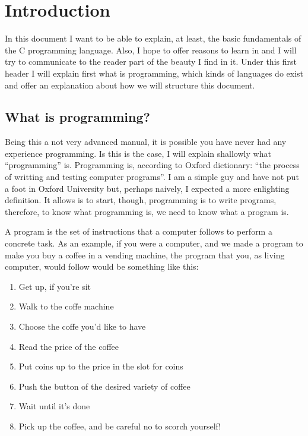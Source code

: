 \documentclass[a4paper]{article}
\begin{document}
\section{Introduction}
In this document I want to be able to explain, at least, the basic fundamentals
of the C programming language. Also, I hope to offer reasons to learn in and
I will try to communicate to the reader part of the beauty I find in it.
Under this first header I will explain first what is programming, which kinds
of languages do exist and offer an explanation about how we will structure this
document.

\label{section:queEsLaProgramacion}
\subsection{What is programming?}
Being this a not very advanced manual, it is possible you have never had any
experience programming. Is this is the case, I will explain shallowly what
``programming'' is. Programming is, according to Oxford dictionary: ``the
process of writting and testing computer programs''. I am a simple guy and
have not put a foot in Oxford University but, perhaps naively, I expected a more
enlighting definition. It allows is to start, though, programming is to write
programs, therefore, to know what programming is, we need to know what a program
is.

A program is the set of instructions that a computer follows to perform a
concrete task. As an example, if you were a computer, and we made a program to
make you buy a coffee in a vending machine, the program that you, as living
computer, would follow would be something like this:

\begin{enumerate}
    \item Get up, if you're sit
    \item Walk to the coffe machine
    \item Choose the coffe you'd like to have
    \item Read the price of the coffee
    \item Put coins up to the price in the slot for coins
    \item Push the button of the desired variety of coffee
    \item Wait until it's done
    \item Pick up the coffee, and be careful no to scorch yourself!
\end{enumerate}
\end{document}
